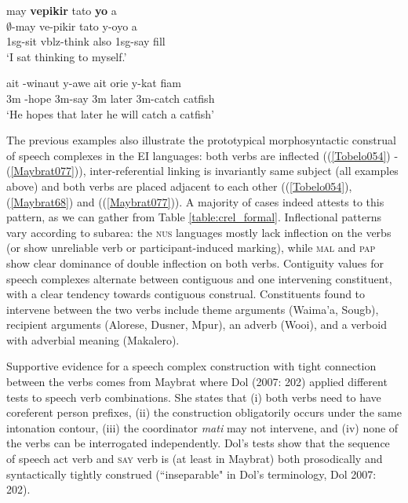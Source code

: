 \ea \label{WBW051}
\gll may \textbf{vepikir} tato \textbf{yo} a \\
$\emptyset$-may ve-pikir tato y-oyo a \\
\glc \acs{1}\acs{sg}-sit \acs{vblz}-think also \acs{1}\acs{sg}-say \acs{fill} \\
\glft `I sat thinking to myself.' \\ 
\z
\xe

\ea \label{Maybrat077}
\gll ait \textipa{\o}-winaut y-awe ait orie y-kat fiam \\
\acs{3}\acs{m} \textipa{\o}-hope \acs{3}\acs{m}-say \acs{3}\acs{m} later \acs{3}\acs{m}-catch catfish \\
\glft `He hopes that later he will catch a catfish' \\ 
\z
\xe

The previous examples also illustrate the prototypical morphosyntactic construal of speech complexes in the EI languages: both verbs are inflected ((\ref{Tobelo054}) - (\ref{Maybrat077})), inter-referential linking is invariantly same subject (all examples above) and both verbs are placed adjacent to each other ((\ref{Tobelo054}), (\ref{Maybrat68}) and ((\ref{Maybrat077})). A majority of cases indeed attests to this pattern, as we can gather from Table \ref{table:crel_formal}. Inflectional patterns vary according to subarea: the \textsc{nus} languages mostly lack inflection on the verbs (or show unreliable verb or participant-induced marking), while \textsc{mal} and \textsc{pap} show clear dominance of double inflection on both verbs. Contiguity values for speech complexes alternate between contiguous and one intervening constituent, with a clear tendency towards contiguous construal. Constituents found to intervene between the two verbs include theme arguments (Waima'a, Sougb), recipient arguments (Alorese, Dusner, Mpur), an adverb (Wooi), and a verboid with adverbial meaning (Makalero).

Supportive evidence for a speech complex construction with tight connection between the verbs comes from Maybrat where Dol (2007: 202) applied different tests to speech verb combinations. She states that (i) both verbs need to have coreferent person prefixes, (ii) the construction obligatorily occurs under the same intonation contour, (iii) the coordinator \textit{mati} may not intervene, and (iv) none of the verbs can be interrogated independently. Dol's tests show that the sequence of speech act verb and \textsc{say} verb is (at least in Maybrat) both prosodically and syntactically tightly construed (``inseparable" in Dol's terminology, Dol 2007: 202).

